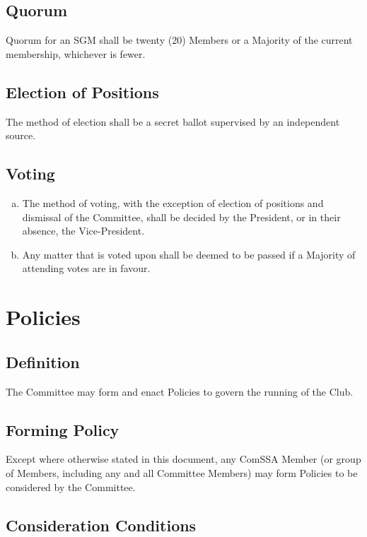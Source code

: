 \documentclass[a4paper,12pt]{article}
\begin{document}
\subsection{Quorum}

Quorum for an SGM shall be twenty (20) Members or a Majority of the current membership, whichever is fewer.

\subsection{Election of Positions}

The method of election shall be a secret ballot supervised by an independent source.

\subsection{Voting}

\begin{enumerate}[a)]
	\item The method of voting, with the exception of election of positions and dismissal of the Committee, shall be decided by the President, or in their absence, the Vice-President.
	\item Any matter that is voted upon shall be deemed to be passed if a Majority of attending votes are in favour.
\end{enumerate}

\section{Policies}

\subsection{Definition}

The Committee may form and enact Policies to govern the running of the Club.

\subsection{Forming Policy}

Except where otherwise stated in this document, any ComSSA Member (or group of Members, including any and all Committee Members) may form Policies to be considered by the Committee.

\subsection{Consideration Conditions}
\end{document}
